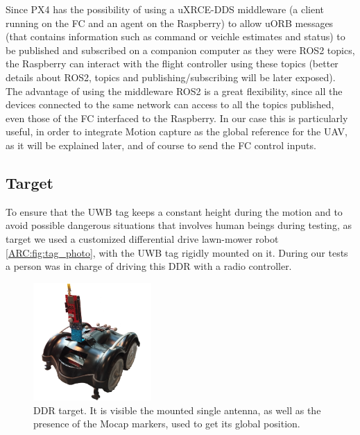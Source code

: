 Since PX4 has the possibility of using a uXRCE-DDS middleware (a client running on the FC and an agent on the Raspberry) to allow uORB messages (that contains information such as command or veichle estimates and status) to be published and subscribed on a companion computer as they were ROS2 topics, the Raspberry can interact with the flight controller using these topics (better details about ROS2, topics and publishing/subscribing will be later exposed). The advantage of using the middleware ROS2 is a great flexibility, since all the devices connected to the same network can access to all the topics published, even those of the FC interfaced to the Raspberry. In our case this is particularly useful, in order to integrate Motion capture as the global reference for the UAV, as it will be explained later, and of course to send the FC control inputs.

\subsection{Target}
To ensure that the UWB tag keeps a constant height during the motion and to avoid possible dangerous situations that involves human beings during testing, as target we used a customized differential drive lawn-mower robot \autoref{ARC:fig:tag_photo}, with the UWB tag rigidly mounted on it. During our tests a person was in charge of driving this DDR with a radio controller.

\begin{figure}
    \centering
    \includegraphics[width=0.4\textwidth]{images/target_reale_tagliato.png}
    \caption{DDR target. It is visible the mounted single antenna, as well as the presence of the Mocap markers, used to get its global position.}
    \label{ARC:fig:tag_photo}
\end{figure}

